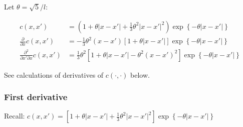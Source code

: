\documentclass{sfuthesis}
\begin{document}
Let $\theta = \sqrt{5} / l$:

\begin{align}
c\left( {x,x'} \right) &= \left( {1 + \theta \left| {x - x'} \right| + \frac{1}{3}{\theta ^2}{{\left| {x - x'} \right|}^2}} \right)\exp \left\{ { - \theta \left| {x - x'} \right|} \right\}\\
\frac{\partial }{{\partial x}}c\left( {x,x'} \right) &=  - \frac{1}{3}{\theta ^2}\left( {x - x'} \right)\left[ {1 + \theta \left| {x - x'} \right|} \right]\exp \left\{ { - \theta \left| {x - x'} \right|} \right\}\\
\frac{{{\partial ^2}}}{{\partial x'\partial x}}c\left( {x,x'} \right) &= \frac{1}{3}{\theta ^2}\left[ {1 + \theta \left| {x - x'} \right| - {\theta ^2}{{\left( {x - x'} \right)}^2}} \right]\exp \left\{ { - \theta \left| {x - x'} \right|} \right\}
\end{align}
    
See calculations of derivatives of $c(\cdot, \cdot)$ below.



\bigskip

\subsubsection{First derivative}

Recall: $c\left( {x,x'} \right) = \left[ {1 + \theta \left| {x - x'} \right| + \frac{1}{3}{\theta ^2}{{\left| {x - x'} \right|}^2}} \right]\exp \left\{ { - \theta \left| {x - x'} \right|} \right\}$
\end{document}
